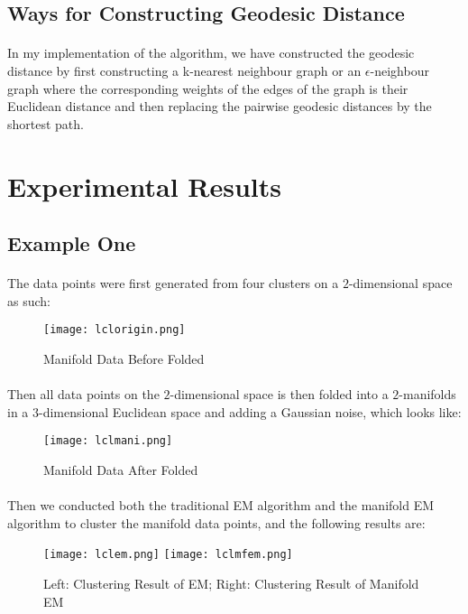 \documentclass{article}
\begin{document}
\subsection{Ways for Constructing Geodesic Distance}
\paragraph{}In my implementation of the algorithm, we have constructed the geodesic distance by first constructing a k-nearest neighbour graph or an $\epsilon$-neighbour graph where the corresponding weights of the edges of the graph is their Euclidean distance and then replacing the pairwise geodesic distances by the shortest path.
\section{Experimental Results}
\subsection{Example One}
\paragraph{}The data points were first generated from four clusters on a $2$-dimensional space as such:
\begin{figure}[H]
  \centering
  \texttt{[image: lclorigin.png]}
  \caption{Manifold Data Before Folded}
\end{figure}
\paragraph{}Then all data points on the $2$-dimensional space is then folded into a $2$-manifolds in a $3$-dimensional Euclidean space and adding a Gaussian noise, which looks like:
\begin{figure}[H]
  \centering
  \texttt{[image: lclmani.png]}
  \caption{Manifold Data After Folded}
\end{figure}
\paragraph{}Then we conducted both the traditional EM algorithm and the manifold EM algorithm to cluster the manifold data points, and the following results are:
\begin{figure}[H]
  \centering
  \texttt{[image: lclem.png]}
  \texttt{[image: lclmfem.png]}
  \caption{Left: Clustering Result of EM; Right: Clustering Result of Manifold EM}
\end{figure}
\end{document}
